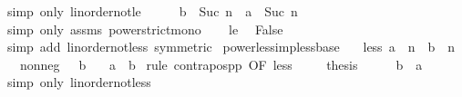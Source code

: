 \begin{isabellebody}
\ {\isacharparenleft}{\kern0pt}simp\ only{\isacharcolon}{\kern0pt}\ linorder{\isacharunderscore}{\kern0pt}not{\isacharunderscore}{\kern0pt}le{\isacharparenright}{\kern0pt}\isanewline
\ \ \isamarkupfalse%
\ \isamarkupfalse%
\ {\isachardoublequoteopen}b\ {\isacharcircum}{\kern0pt}\ Suc\ n\ {\isacharless}{\kern0pt}\ a\ {\isacharcircum}{\kern0pt}\ Suc\ n{\isachardoublequoteclose}\isanewline
\ \ \ \ \isamarkupfalse%
\ {\isacharparenleft}{\kern0pt}simp\ only{\isacharcolon}{\kern0pt}\ assms{\isacharparenleft}{\kern0pt}{}{\isacharparenright}{\kern0pt}\ power{\isacharunderscore}{\kern0pt}strict{\isacharunderscore}{\kern0pt}mono{\isacharparenright}{\kern0pt}\isanewline
\ \ \isamarkupfalse%
\ le\ \isamarkupfalse%
\ False\isanewline
\ \ \ \ \isamarkupfalse%
\ {\isacharparenleft}{\kern0pt}simp\ add{\isacharcolon}{\kern0pt}\ linorder{\isacharunderscore}{\kern0pt}not{\isacharunderscore}{\kern0pt}less\ {\isacharbrackleft}{\kern0pt}symmetric{\isacharbrackright}{\kern0pt}{\isacharparenright}{\kern0pt}\isanewline
{}\isamarkupfalse%
%
\endisatagproof
{\isafoldproof}%
%
\isadelimproof
\isanewline
%
\endisadelimproof
\isanewline
{}\isamarkupfalse%
\ power{\isacharunderscore}{\kern0pt}less{\isacharunderscore}{\kern0pt}imp{\isacharunderscore}{\kern0pt}less{\isacharunderscore}{\kern0pt}base{\isacharcolon}{\kern0pt}\isanewline
\ \ \ less{\isacharcolon}{\kern0pt}\ {\isachardoublequoteopen}a\ {\isacharcircum}{\kern0pt}\ n\ {\isacharless}{\kern0pt}\ b\ {\isacharcircum}{\kern0pt}\ n{\isachardoublequoteclose}\isanewline
\ \ \ nonneg{\isacharcolon}{\kern0pt}\ {\isachardoublequoteopen}{}\ {\isasymle}\ b{\isachardoublequoteclose}\isanewline
\ \ \ {\isachardoublequoteopen}a\ {\isacharless}{\kern0pt}\ b{\isachardoublequoteclose}\isanewline
%
\isadelimproof
%
\endisadelimproof
%
\isatagproof
{}\isamarkupfalse%
\ {\isacharparenleft}{\kern0pt}rule\ contrapos{\isacharunderscore}{\kern0pt}pp\ {\isacharbrackleft}{\kern0pt}OF\ less{\isacharbrackright}{\kern0pt}{\isacharparenright}{\kern0pt}\isanewline
\ \ \isamarkupfalse%
\ {\isachardoublequoteopen}{\isasymnot}\ {\isacharquery}{\kern0pt}thesis{\isachardoublequoteclose}\isanewline
\ \ \isamarkupfalse%
\ \isamarkupfalse%
\ {\isachardoublequoteopen}b\ {\isasymle}\ a{\isachardoublequoteclose}\ \isamarkupfalse%
\ {\isacharparenleft}{\kern0pt}simp\ only{\isacharcolon}{\kern0pt}\ linorder{\isacharunderscore}{\kern0pt}not{\isacharunderscore}{\kern0pt}less{\isacharparenright}{\kern0pt}\isanewline

\end{isabellebody}

